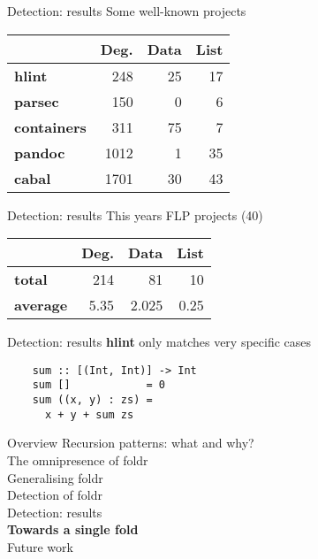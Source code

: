 \documentclass[20pt]{beamer}
\newcommand{\vspaced}{
    \vspace{5mm}
}
\begin{document}
\begin{frame}{Detection: results}
    Some well-known projects \\
    \vspaced
    \begin{tabular}{l|rrr}
                            & \textbf{Deg.} & \textbf{Data} & \textbf{List} \\
        \hline
        \textbf{hlint}      &           248 &            25 &            17 \\
        \textbf{parsec}     &           150 &             0 &             6 \\
        \textbf{containers} &           311 &            75 &             7 \\
        \textbf{pandoc}     &          1012 &             1 &            35 \\
        \textbf{cabal}      &          1701 &            30 &            43 \\
    \end{tabular}
\end{frame}

\begin{frame}{Detection: results}
    This years FLP projects (40) \\
    \vspaced
    \begin{tabular}{l|rrr}
                         & \textbf{Deg.} & \textbf{Data} & \textbf{List} \\
        \hline
        \textbf{total}   &           214 &            81 &            10 \\
        \textbf{average} &          5.35 &         2.025 &          0.25 \\
    \end{tabular}
\end{frame}

\begin{frame}[fragile]{Detection: results}
    \textbf{hlint} only matches very specific cases \\
    \vspaced
    \begin{lstlisting}
    sum :: [(Int, Int)] -> Int
    sum []            = 0
    sum ((x, y) : zs) =
      x + y + sum zs
    \end{lstlisting}
\end{frame}


\begin{frame}{Overview}
    Recursion patterns: what and why? \\
    The omnipresence of foldr \\
    Generalising foldr \\
    Detection of foldr \\
    Detection: results \\
    \textbf{Towards a single fold} \\
    Future work \\
\end{frame}
\end{document}
